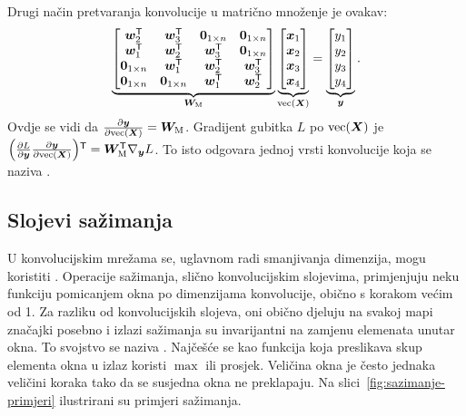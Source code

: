 \documentclass[utf8, diplomski, lmodern]{fer}
\begin{document}
Drugi način pretvaranja konvolucije u matrično množenje je ovakav: 
\begin{align}
\underbrace{
\begin{bmatrix}
\vec w_2^\tp & \vec w_3^\tp & \cvec 0_{1\times n} & \cvec 0_{1\times n} \\
\vec w_1^\tp & \vec w_2^\tp & \vec w_3^\tp & \cvec 0_{1\times n} \\
\cvec 0_{1\times n} & \vec w_1^\tp & \vec w_2^\tp & \vec w_3^\tp \\
\cvec 0_{1\times n} & \cvec 0_{1\times n} & \vec w_1^\tp & \vec w_2^\tp 
\end{bmatrix}
}_{\vec W_\text{M}}
\underbrace{
	\begin{bmatrix}
	\vec x_1 \\ \vec x_2 \\ \vec x_3 \\ \vec x_4 
	\end{bmatrix}
}_{\vecfunc(\vec X)}
= 
\underbrace{
	\begin{bmatrix}
	y_1 \\ y_2 \\ y_3 \\y_4     
	\end{bmatrix}
}_{\vec y}
\text{.}
\end{align}
Ovdje se vidi da $\pd{\vec y}{\vecfunc(\vec X)}=\vec W_\text{M}$. Gradijent gubitka $L$ po $\vecfunc(\vec X)$ je $\del{\pd{L}{\vec y}\pd{\vec y}{\vecfunc(\vec X)}}^\tp = \vec W_\text{M}^\tp\nabla_{\vec y}L$. To isto odgovara jednoj vrsti konvolucije koja se naziva  \citep{Segvic:2018:DUUUKS}.

\subsection{Slojevi sažimanja}

U konvolucijskim mrežama se, uglavnom radi smanjivanja dimenzija, mogu koristiti . Operacije sažimanja, slično konvolucijskim slojevima, primjenjuju neku funkciju pomicanjem okna po dimenzijama konvolucije, obično s korakom većim od 1. Za razliku od konvolucijskih slojeva, oni obično djeluju na svakoj mapi značajki posebno i izlazi sažimanja su invarijantni na zamjenu elemenata unutar okna. To svojstvo se naziva . Najčešće se kao funkcija koja preslikava skup elementa okna u izlaz koristi $\max$ ili prosjek. Veličina okna je često jednaka veličini koraka tako da se susjedna okna ne preklapaju. Na slici~\ref{fig:sazimanje-primjeri} ilustrirani su primjeri sažimanja.
\end{document}
